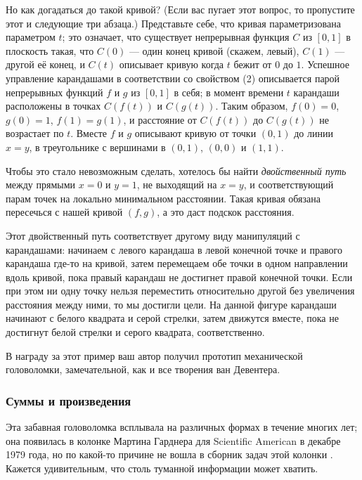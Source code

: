 Но как догадаться до такой кривой?
(Если вас пугает этот вопрос, то пропустите этот и следующие три абзаца.)
Представьте себе, что кривая параметризована параметром $t$;
это означает, что существует непрерывная функция $C$ из $[0, 1]$ в плоскость такая, что $C(0)$ --- один конец кривой (скажем, левый), $C(1)$ --- другой её конец, и $C(t)$ описывает кривую когда $t$ бежит от $0$ до $1$.
Успешное управление карандашами в соответствии со свойством (2) описывается парой непрерывных функций $f$ и $g$ из $[0,1]$ в себя;
в момент времени $t$ карандаши расположены в точках $C(f(t))$ и $C(g(t))$.
Таким образом, $f (0) = 0$, $g(0) = 1$, $f (1) = g(1)$, и расстояние от $C(f (t))$ до $C(g(t))$ не возрастает по $t$.
Вместе $f$ и $g$ описывают кривую от точки $(0,1)$ до линии $x = y$, в треугольнике с вершинами в $(0,1)$, $(0,0)$ и $(1,1)$.

Чтобы это стало невозможным сделать, хотелось бы найти \emph{двойственный путь} между прямыми $x = 0$ и $y = 1$, не выходящий на $x = y$, и соответствующий парам точек на локально минимальном расстоянии.
Такая кривая обязана пересечься с нашей кривой $(f, g)$, а это даст подскок расстояния.

Этот двойственный путь соответствует другому виду манипуляций с карандашами:
начинаем с левого карандаша в левой конечной точке и правого карандаша где-то на кривой,
затем перемещаем обе точки в одном направлении вдоль кривой, пока правый карандаш не достигнет правой конечной точки.
Если при этом ни одну точку нельзя переместить относительно другой без увеличения расстояния между ними, то мы достигли цели.
На данной фигуре карандаши начинают с белого квадрата и серой стрелки, затем движутся вместе, пока не достигнут белой стрелки и серого квадрата, соответственно.

\medskip

В награду за этот пример ваш автор получил прототип механической головоломки, замечательной, как и все творения ван Девентера.

\subsubsection*{Суммы и произведения}

Эта забавная головоломка всплывала на различных формах в течение многих лет; она появилась в колонке Мартина Гарднера для Scientific American в декабре 1979 года, но по какой-то причине не вошла в сборник задач этой колонки \cite{29}.
Кажется удивительным, что столь туманной информации может хватить.

